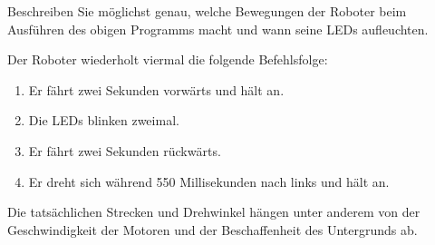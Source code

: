 \begin{myexercise}
    Beschreiben Sie möglichst genau, welche Bewegungen
    der Roboter beim Ausführen des obigen Programms macht
    und wann seine LEDs aufleuchten.

    \begin{myanswer}
        Der Roboter wiederholt viermal die folgende
        Befehlsfolge:
        \begin{enumerate}
            \item Er fährt zwei Sekunden vorwärts und hält an.
            \item Die LEDs blinken zweimal.
            \item Er fährt zwei Sekunden rückwärts.
            \item Er dreht sich während 550 Millisekunden
                  nach links und hält an.
        \end{enumerate}
        Die tatsächlichen Strecken und Drehwinkel hängen
        unter anderem von der Geschwindigkeit der Motoren
        und der Beschaffenheit des Untergrunds ab.
    \end{myanswer}
\end{myexercise}


